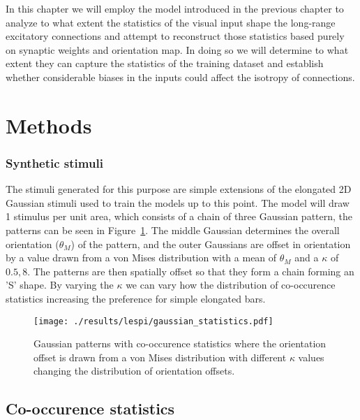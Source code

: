 In this chapter we will employ the model introduced in the previous
chapter to analyze to what extent the statistics of the visual input
shape the long-range excitatory connections and attempt to reconstruct
those statistics based purely on synaptic weights and orientation
map. In doing so we will determine to what extent they can capture the
statistics of the training dataset and establish whether considerable
biases in the inputs could affect the isotropy of connections.

\section{Methods}

\subsubsection{Synthetic stimuli} \label{synthetic}

The stimuli generated for this purpose are simple extensions of the
elongated 2D Gaussian stimuli used to train the models up to this
point. The model will draw 1 stimulus per unit area, which consists of
a chain of three Gaussian pattern, the patterns can be seen in
Figure~\ref{GaussianStatistics}. The middle Gaussian determines the
overall orientation ($\theta_M$) of the pattern, and the outer
Gaussians are offset in orientation by a value drawn from a von Mises
distribution with a mean of $\theta_M$ and a $\kappa$ of ${0.5,
  8}$. The patterns are then spatially offset so that they form a
chain forming an 'S' shape. By varying the $\kappa$ we can vary how
the distribution of co-occurence statistics increasing the preference
for simple elongated bars.

\begin{figure}
	\centering
	\texttt{[image: ./results/lespi/gaussian\_statistics.pdf]}
	\caption[Example of Gaussian patterns with co-occurence
      statistics] {Gaussian patterns with co-occurence statistics
      where the orientation offset is drawn from a von Mises
      distribution with different $\kappa$ values changing the
      distribution of orientation offsets.}
    \label{GaussianStatistics}
\end{figure}

\subsection{Co-occurence statistics}

